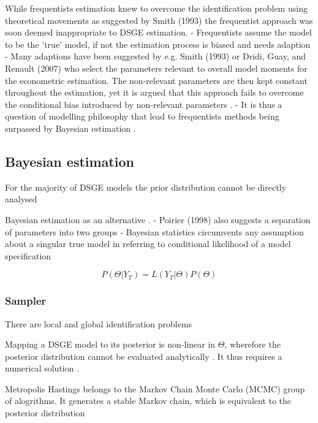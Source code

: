 \documentclass[11pt,a4paper,english]{article} %
\begin{document}
	While frequentists estimation knew to overcome the identification problem using theoretical movements as suggested by Smith (1993) the frequentist approach was soon deemed inappropriate to DSGE estimation. 
	- Frequentists assume the model to be the 'true' model, if not the estimation process is biased and needs adaption
	- Many adaptions have been suggested by e.g. Smith (1993) or Dridi, Guay, and Renault (2007) who select the parameters relevant to overall model moments for the econometric estimation. The non-relevant parameters are then kept constant throughout the estimation, yet it is argued that this approach fails to overcome the conditional bias introduced by non-relevant parameters \cite{guerron-quintana_bayesian_2013}.
	- It is thus a question of modelling philosophy that lead to frequentists methods being surpassed by Bayesian estimation \cite{guerron-quintana_bayesian_2013}.
	
	
	\subsection{Bayesian estimation}
	
	For the majority of DSGE models the prior distribution cannot be directly analysed \cite{herbst_bayesian_2014}
	
	
	Bayesian estimation as an alternative \cite{guerron-quintana_bayesian_2013}.
	- Poirier (1998) also suggests a separation of parameters into two groups
	- Bayesian statistics circumvents any assumption about a singular true model in referring to conditional likelihood of a model specification
	
	\[
		P( \Theta | Y_{T}) = L(Y_{T} | \Theta) P(\Theta)
	\]
	
	\subsubsection{Sampler}
	
	There are local and global identification problems \cite{herbst_bayesian_2014}
	
	Mapping a DSGE model to its posterior is non-linear in $\Theta$, wherefore the posterior distribution cannot be evaluated analytically \cite{herbst_bayesian_2014}. It thus requires a numerical solution \cite{guerron-quintana_bayesian_2013}.
	
	Metropolis Hastings belongs to the Markov Chain Monte Carlo (MCMC) group of alogrithms. 
	It generates a stable Markov chain, which is equivalent to the posterior distribution \cite{herbst_bayesian_2014}
	\\
	
\end{document}
